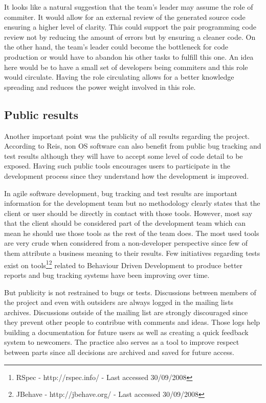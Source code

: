 It looks like a natural suggestion that the team's leader may assume
the role of commiter. It would allow for an external review of the
generated source code ensuring a higher level of clarity. This could
support the pair programming code review not by reducing the amount of
errors but by ensuring a cleaner code. On the other hand, the team's
leader could become the bottleneck for code production or would have
to abandon his other tasks to fulfill this one. An idea here would be
to have a small set of developers being commiters and this role would
circulate. Having the role circulating allows for a better knowledge
spreading and reduces the power weight involved in this role.

\subsection{Public results}
\label{subsec:publicity}

Another important point was the publicity of all results regarding the
project. According to Reis, non OS software can also benefit from
public bug tracking and test results although they will have to accept
some level of code detail to be exposed. Having such public tools
encourages users to participate in the development process since they
understand how the development is improved.

In agile software development, bug tracking and test results are
important information for the development team but no methodology
clearly states that the client or user should be directly in contact
with those tools. However, most say that the client should be
considered part of the development team which can mean he should use
those tools as the rest of the team does. The most used tools are very
crude when considered from a non-developer perspective since few of
them attribute a business meaning to their results. Few initiatives
regarding tests exist on tools\footnote{RSpec - http://rspec.info/ -
  Last accessed 30/09/2008}\footnote{JBehave - http://jbehave.org/ -
  Last accessed 30/09/2008} related to Behaviour Driven Development
\cite{North2006} to produce better reports and bug tracking systems
have been improving over time.

But publicity is not restrained to bugs or tests. Discussions between
members of the project and even with outsiders are always logged in
the mailing lists archives. Discussions outside of the mailing list
are strongly discouraged since they prevent other people to contribue
with comments and ideas.  Those logs help building a documentation for
future users as well as creating a quick feedback system to
newcomers. The practice also serves as a tool to improve respect
between parts since all decisions are archived and saved for future
access.

